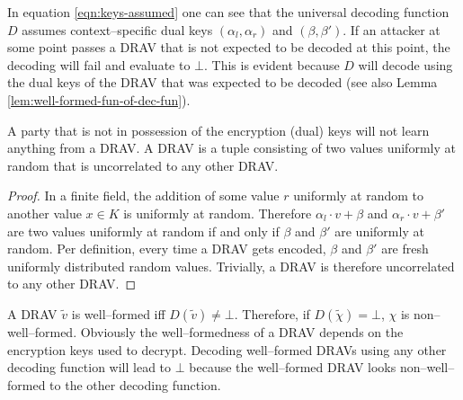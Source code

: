 \noindent{}In equation \ref{eqn:keys-assumed} one can see that the universal
decoding function $D$ assumes context--specific  dual keys $(\alpha_l,
\alpha_r)$ and $(\beta, \beta')$. If an attacker at some point passes a DRAV
that is not expected to be decoded at this point, the decoding will fail and
evaluate to $\bot$. This is evident because $D$ will decode using the dual keys
of the DRAV that was expected to be decoded (see also Lemma
\ref{lem:well-formed-fun-of-dec-fun}).

\begin{lem}
  \label{lem:DRAV-random}

  A party that is not in possession of the encryption (dual) keys will not learn
  anything from a DRAV. A DRAV is a tuple consisting of two values uniformly at
  random that is uncorrelated to any other DRAV.

\end{lem}
\begin{proof}

  In a finite field, the addition of some value $r$ uniformly at random to
  another value $x \in K$ is uniformly at random. Therefore $\alpha_l \cdot v +
  \beta$ and $\alpha_r \cdot v + \beta'$ are two values uniformly at random if
  and only if $\beta$ and $\beta'$ are uniformly at random. Per definition,
  every time a DRAV gets encoded, $\beta$ and $\beta'$ are fresh uniformly
  distributed random values. Trivially, a DRAV is therefore uncorrelated to any
  other DRAV.

\end{proof}



A DRAV $\widetilde{v}$ is well--formed iff $D(\widetilde{v}) \neq \bot$.
Therefore, if $D(\widetilde{\chi}) = \bot$, $\chi$ is non--well--formed.
Obviously the well--formedness of a DRAV depends on the encryption keys used to
decrypt. Decoding well--formed DRAVs using any other decoding function will
lead to $\bot$ because the well--formed DRAV looks non--well--formed to the
other decoding function.

